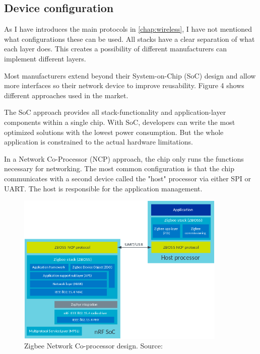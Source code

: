 \subsection{Device configuration}
\label{sec:multi:dc}
As I have introduces the main protocols in \autoref{chap:wireless}, I have not mentioned what configurations these can be used. All stacks have a clear separation of what each layer does. This creates a possibility of different manufacturers can implement different layers.

Most manufacturers extend beyond their System-on-Chip (SoC) design and allow more interfaces so their network device to improve reusability. Figure 4 shows different approaches used in the market.

The SoC approach provides all stack-functionality and application-layer components within a single chip. With SoC, developers can write the most optimized solutions with the lowest power consumption. But the whole application is constrained to the actual hardware limitations.

In a Network Co-Processor (NCP) approach, the chip only runs the functions necessary for networking. The most common configuration is that the chip communicates with a second device called the "host" processor via either SPI or UART. The host is responsible for the application management.

\begin{figure}
    \centering
    \includegraphics[width=100mm, keepaspectratio]{figures/zigbee_platform_design_ncp-nordicsemi.png}
    \caption{Zigbee Network Co-processor design. Source: \cite{nordic:zigbee}}
    \label{fig:mp:zig-ncp}
\end{figure}

